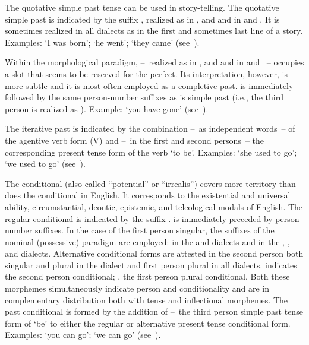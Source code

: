 The quotative simple past tense can be used in story-telling. The quotative simple past is indicated by the suffix , realized as  in \ACH, \AMV{} and \SP{} and  in \CH{} and \LT. It is sometimes realized in all dialects as  in the first and sometimes last line of a story. Examples:  ‘I was born’;  ‘he went’;  ‘they came’ (see~).

Within the morphological paradigm,  --~realized as  in \ACH, \AMV{} and \SP{} and  in \CH{} and \LT~-- occupies a slot that seems to be reserved for the perfect. Its interpretation, however, is more subtle and it is most often employed as a completive past.  is immediately followed by the same person-number suffixes as is simple past (i.e., the third person is realized as \phono{-\uo}). Example:  ‘you have gone’ (see~).

The iterative past is indicated by the combination --~as independent words~-- of the agentive verb form (V) and --~in the first and second persons~-- the corresponding present tense form of the verb  ‘to be’. Examples:  ‘she used to go’;  ‘we used to go’ (see~).

The conditional (also called “potential” or “irrealis”) covers more territory than does the conditional in English. It corresponds to the existential and universal ability, circumstantial, deontic, epistemic, and teleological modals of English. The regular conditional is indicated by the suffix .  is immediately preceded by person-number suffixes. In the case of the first person singular, the suffixes of the nominal (possessive) paradigm are employed:  in the \AMV{} and \LT{} dialects and \phono{-:} in the \ACH, \CH, and \SP{} dialects. Alternative conditional forms are attested in the second person both singular and plural in the \AMV{} dialect and first person plural in all dialects.  indicates the second person conditional; , the first person plural conditional. Both these morphemes simultaneously indicate person and conditionality and are in complementary distribution both with tense and inflectional morphemes. The past conditional is formed by the addition of  --~the third person simple past tense form of  ‘be’ to either the regular or alternative present tense conditional form. Examples:  ‘you can go’;  ‘we can go’ (see~).

